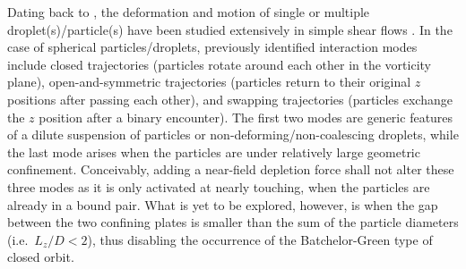 Dating back to  \cite{Taylor501}, the deformation and motion of single or multiple droplet(s)/particle(s) have been studied extensively in simple shear flows \citep{lin_lee_sather_1970,batchelor_green_1972, batchelor_green_1972b,Zinchenko1983,Zinchenko1984,zurita-gotor_2007}. In the case of spherical particles/droplets, previously identified interaction modes include closed trajectories (particles rotate around each other in the vorticity plane), open-and-symmetric trajectories (particles return to their original $z$ positions after passing each other), and swapping trajectories (particles exchange the $z$ position after a binary encounter). The first two modes are generic features of a dilute suspension of particles or non-deforming/non-coalescing droplets, while the last mode arises when the particles are under relatively large geometric confinement. Conceivably, adding a near-field depletion force shall not alter these three modes as it is only activated at nearly touching, when the particles are already in a bound pair. What is yet to be explored, however, is when the gap between the two confining plates is smaller than the sum of the particle diameters (i.e.\ $L_z/D<2$), thus disabling the occurrence of the Batchelor-Green type of closed orbit.


